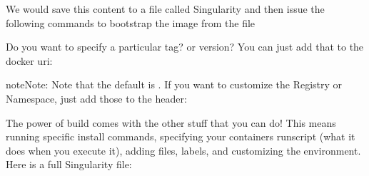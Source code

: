 \documentclass[letterpaper,10pt,english]{sphinxmanual}
\begin{document}
%
\begin{sphinxVerbatim}[commandchars=\\\{\}]
 

 
\end{sphinxVerbatim}

We would save this content to a file called Singularity and then issue
the following commands to bootstrap the image from the file

%
\begin{sphinxVerbatim}[commandchars=\\\{\}]
    
\end{sphinxVerbatim}

Do you want to specify a particular tag? or version? You can just add
that to the docker uri:

%
\begin{sphinxVerbatim}[commandchars=\\\{\}]
 

 
\end{sphinxVerbatim}

\begin{sphinxadmonition}{note}{Note:}
Note that the default is  . If you want to customize the Registry or
Namespace, just add those to the header:
\end{sphinxadmonition}

%
\begin{sphinxVerbatim}[commandchars=\\\{\}]
 

 

 

 
\end{sphinxVerbatim}

The power of build comes with the other stuff that you can do! This
means running specific install commands, specifying your containers
runscript (what it does when you execute it), adding files, labels, and
customizing the environment. Here is a full Singularity file:
\end{document}
